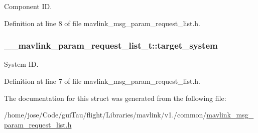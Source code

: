 Component I\-D. 



Definition at line 8 of file mavlink\-\_\-msg\-\_\-param\-\_\-request\-\_\-list.\-h.

\hypertarget{struct____mavlink__param__request__list__t_aae3ba45d3ff75c3603ec6bf4eb58b244}{
\subsubsection[{target\-\_\-system}]{ \-\_\-\-\_\-mavlink\-\_\-param\-\_\-request\-\_\-list\-\_\-t\-::target\-\_\-system}}\label{struct____mavlink__param__request__list__t_aae3ba45d3ff75c3603ec6bf4eb58b244}


System I\-D. 



Definition at line 7 of file mavlink\-\_\-msg\-\_\-param\-\_\-request\-\_\-list.\-h.



The documentation for this struct was generated from the following file\-:\begin{DoxyCompactItemize}
\item 
/home/jose/\-Code/gui\-Tau/flight/\-Libraries/mavlink/v1./common/\hyperlink{mavlink__msg__param__request__list_8h}{mavlink\-\_\-msg\-\_\-param\-\_\-request\-\_\-list.\-h}\end{DoxyCompactItemize}
